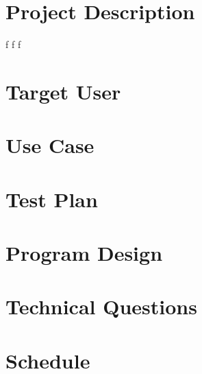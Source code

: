\documentclass[11pt,a4paper]{report}
\author{Artem Los}
\begin{document}
\chapter{Project Description}
f
f
\newpage
f
\chapter{Target User}
\chapter{Use Case}
\chapter{Test Plan}
\chapter{Program Design}
\chapter{Technical Questions}
\chapter{Schedule}
\end{document}
